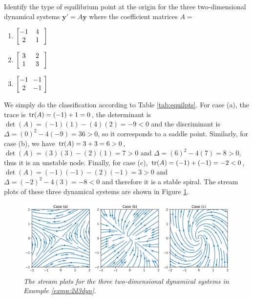 \begin{exmp}
\label{exmp:2d3dyn}
Identify the type of equilibrium point at the origin for the three two-dimensional dynamical systems $\textbf{y}' = A\textbf{y}$ where the coefficient matrices $A = $ 
\begin{enumerate}[label=(\alph*)]
    \item $\left[\begin{array}{@{\,}wc{10pt}wc{10pt}wc{10pt}@{}}
    -1 & 4 \\
    2 & 1
    \end{array}\right]$
    \item $\left[\begin{array}{@{\,}wc{10pt}wc{10pt}wc{10pt}@{}}
    3 & 2 \\
    1 & 3
    \end{array}\right]$
    \item $\left[\begin{array}{@{\,}wc{10pt}wc{10pt}wc{10pt}@{}}
    -1 & -1 \\
    2 & -1
    \end{array}\right]$
\end{enumerate}
\end{exmp}
\begin{solution}
We simply do the classification according to Table \ref{tab:equilpts}. For case (a), the trace is $\tr(A) = (-1) + 1 = 0$, the determinant is $\det(A) = (-1)(1) - (4)(2) = -9 < 0$ and the discriminant is $\Delta = (0)^2 - 4(-9) = 36 > 0$, so it corresponds to a saddle point. Similarly, for case (b), we have $\tr(A) = 3 + 3 = 6 > 0$, $\det(A) = (3)(3) - (2)(1) = 7 > 0$ and $\Delta = (6)^2 - 4(7) = 8 > 0$, thus it is an unstable node. Finally, for case (c), $\tr(A) = (-1) + (-1) = -2 < 0$, $\det(A) = (-1)(-1) - (2)(-1) = 3 > 0$ and $\Delta = (-2)^2 - 4(3) = -8 < 0$ and therefore it is a stable spiral. The stream plots of these three dynamical systems are shown in Figure \ref{fig:2d3dyn}. 
\end{solution}

\begin{figure}[ht!]
    \centering
    \includegraphics[width=\textwidth]{graphics/3exmps2ddynamic.png}
    \caption{\textit{The stream plots for the three two-dimensional dynamical systems in Example \ref{exmp:2d3dyn}.}}
    \label{fig:2d3dyn}
\end{figure}

